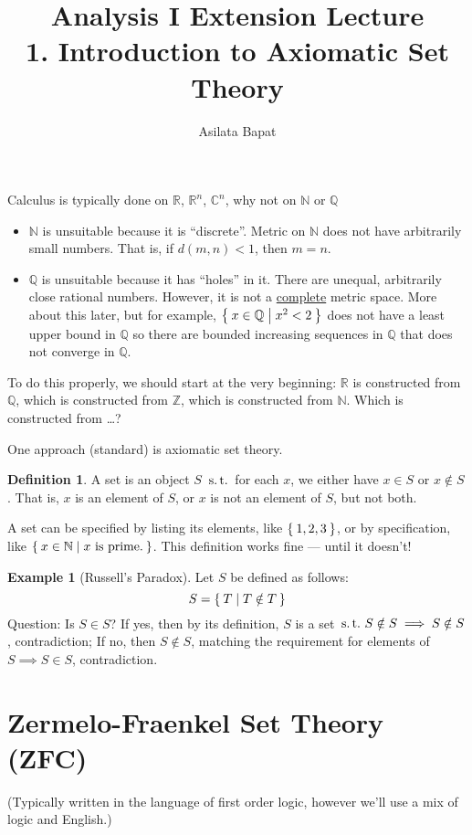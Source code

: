 \documentclass[12pt]{amsart}
\title[Introduction to Axiomatic Set Theory]
	{Analysis I Extension Lecture\\1. Introduction to Axiomatic Set Theory}
\author{Asilata Bapat}
\newcommand{\bbR}{\mathbb{R}}
\newcommand{\bbN}{\mathbb{N}}
\newcommand{\bbZ}{\mathbb{Z}}
\newcommand{\bbQ}{\mathbb{Q}}
\newcommand{\bbC}{\mathbb{C}}
\newcommand{\suchthat}{\operatorname{\thinspace s.t. \thinspace}}
\theoremstyle{plain}
\theoremstyle{remark}
\theoremstyle{definition}
\newtheorem*{define}{Definition}
\newtheorem*{eg}{Example}
\begin{document}
\maketitle
{}

Calculus is typically done on $\bbR$, $\bbR^n$, $\bbC^n$, why not on $\bbN$ or $\bbQ$
\begin{itemize}[-]
	\item $\bbN$ is unsuitable because it is ``discrete''. Metric on $\bbN$ does not have arbitrarily small numbers. That is, if $d(m,n) < 1$, then $m = n$.
	\item $\bbQ$ is unsuitable because it has ``holes'' in it. There are unequal, arbitrarily close rational numbers. However, it is not a 	     \ul{complete} metric space. More about this later, but for example, $\Set{x \in \bbQ | x^2 < 2}$ does not have a least upper bound in $\bbQ$ so there are bounded increasing sequences in $\bbQ$ that does not converge in $\bbQ$.
\end{itemize}
To do this properly, we should start at the very beginning: $\bbR$ is constructed from $\bbQ$, which is constructed from $\bbZ$, which is constructed from $\bbN$. Which is constructed from \dots ?

\par
One approach (standard) is axiomatic set theory.
\begin{define}
	A set is an object $S$ $\suchthat$ for each $x$, we either have $x \in S$ or $x \notin S$. That is, $x$ is an element of $S$, or $x$ is not an element of $S$, but not both.
\end{define}
A set can be specified by listing its elements, like $\Set{1, 2, 3}$, or by specification, like $\Set{x \in \bbN| x \text{ is prime.}}$. This definition works fine --- until it doesn't!
\newline
\begin{eg}[Russell's Paradox]
Let $S$ be defined as follows:
\begin{equation*}
	S = \Set{T| T \notin T}
\end{equation*}
Question: Is $S \in S$?
If yes, then by its definition, $S$ is a set $\suchthat S \notin S \implies S \notin S$, contradiction;
If no, then $S \notin S$, matching the requirement for elements of $S \implies S \in S$, contradiction.
\end{eg}
\section*{\bf Zermelo-Fraenkel Set Theory (ZFC)} 
(Typically written in the language of first order logic, however we'll use a mix of logic and English.)
\end{document}
